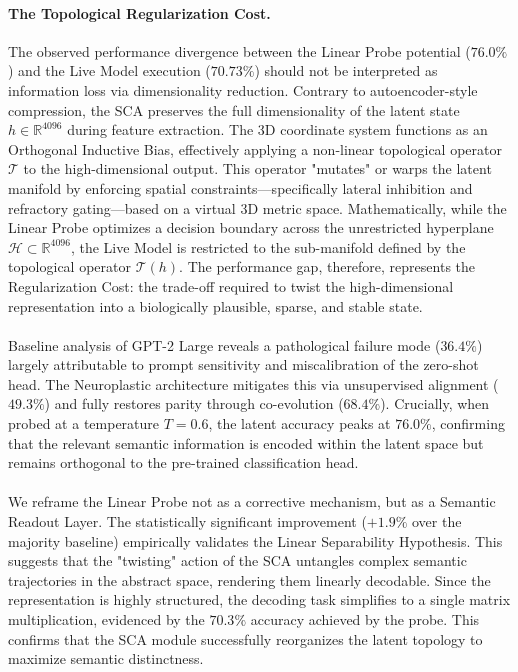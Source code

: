 \documentclass[11pt, letterpaper]{article}
\begin{document}
\paragraph{The Topological Regularization Cost.} The observed performance divergence between the Linear Probe potential ($76.0\%$) and the Live Model execution ($70.73\%$) should not be interpreted as information loss via dimensionality reduction. Contrary to autoencoder-style compression, the SCA preserves the full dimensionality of the latent state $h \in \mathbb{R}^{4096}$ during feature extraction. The 3D coordinate system functions as an Orthogonal Inductive Bias, effectively applying a non-linear topological operator $\mathcal{T}$ to the high-dimensional output. This operator "mutates" or warps the latent manifold by enforcing spatial constraints—specifically lateral inhibition and refractory gating—based on a virtual 3D metric space. Mathematically, while the Linear Probe optimizes a decision boundary across the unrestricted hyperplane $\mathcal{H} \subset \mathbb{R}^{4096}$, the Live Model is restricted to the sub-manifold defined by the topological operator $\mathcal{T}(h)$. The performance gap, therefore, represents the Regularization Cost: the trade-off required to twist the high-dimensional representation into a biologically plausible, sparse, and stable state.

\paragraph{}
Baseline analysis of GPT-2 Large reveals a pathological failure mode ($36.4\%$) largely attributable to prompt sensitivity and miscalibration of the zero-shot head. The Neuroplastic architecture mitigates this via unsupervised alignment ($49.3\%$) and fully restores parity through co-evolution ($68.4\%$). Crucially, when probed at a temperature $T=0.6$, the latent accuracy peaks at $76.0\%$, confirming that the relevant semantic information is encoded within the latent space but remains orthogonal to the pre-trained classification head.

\paragraph{}
We reframe the Linear Probe not as a corrective mechanism, but as a Semantic Readout Layer. The statistically significant improvement ($+1.9\%$ over the majority baseline) empirically validates the Linear Separability Hypothesis. This suggests that the "twisting" action of the SCA untangles complex semantic trajectories in the abstract space, rendering them linearly decodable. Since the representation is highly structured, the decoding task simplifies to a single matrix multiplication, evidenced by the $70.3\%$ accuracy achieved by the probe. This confirms that the SCA module successfully reorganizes the latent topology to maximize semantic distinctness.
\end{document}
